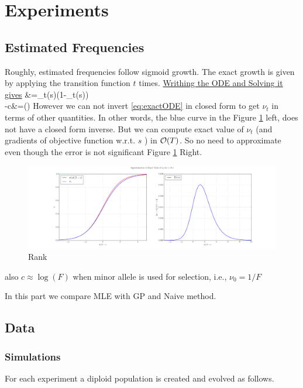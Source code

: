 \section{Experiments}
\subsection{Estimated Frequencies}
Roughly, estimated frequencies follow sigmoid growth. The exact growth is given by applying the transition function $t$ times.
\href{http://www.wolframalpha.com/input/?i=dx%2Fdt+%3D+s%2F2+%28x%281-x%29%29+%281%2F%281%2Bsx%29%29}{Writhing the ODE and Solving it gives}%
\beqn
   &=\nu_t(s)(1-\nu_t(s)) \\
  -c&=\log\left(\right)   \label{eq:eactODE}
\eeqn
However we can not invert \ref{eq:exactODE} in closed form to get $\nu_t$ in terms of other quantities. In other words, the blue curve in the Figure \ref{fig:sigmoid} left, does not have a closed form inverse. But we can compute exact value of $\nu_t$ (and gradients of objective function w.r.t. $s$ ) in ${\cal O}(T)$. So no need to approximate even though the error is not significant Figure \ref{fig:sigmoid} Right.

\begin{figure}[H]
  \centering
    \includegraphics[width=\textwidth]{apprx}
  \caption{Rank}
  \label{fig:sigmoid}
\end{figure}

also $c \approx  \log(F)$ when minor allele is used for selection, i.e., $\nu_0=1/F$

In this part we compare MLE with GP and Naive method. 
\subsection{Data}
\subsubsection{Simulations}
For each experiment a diploid population is created and evolved as follows. 
